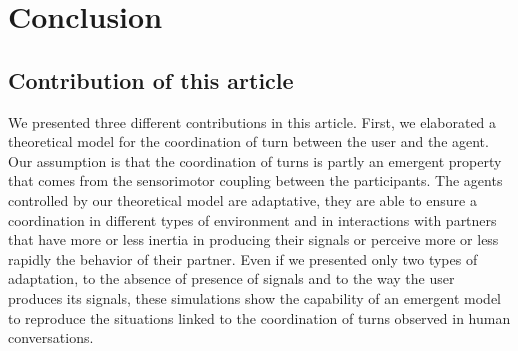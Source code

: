 \section{Conclusion}

\subsection{Contribution of this article}

We presented three different contributions in this article. First, we elaborated a theoretical model for the coordination of turn between the user and the agent. Our assumption is that the coordination of turns is partly an emergent property that comes from the sensorimotor coupling between the participants. 
The agents controlled by our theoretical model are adaptative, they are able to ensure a coordination in different types of environment and in interactions with partners that have more or less inertia in producing their signals or perceive more or less rapidly the behavior of their partner. Even if we presented only two types of adaptation, to the absence of presence of signals and to the way the user produces its signals, these simulations show the capability of an emergent model to reproduce the situations linked to the coordination of turns observed in human conversations.

